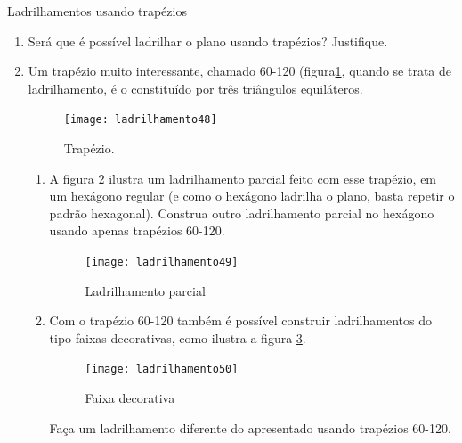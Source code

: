 \begin{task}{Ladrilhamentos usando trapézios}
\begin{enumerate}
\item Será que é possível ladrilhar o plano usando trapézios? Justifique.

\item Um trapézio muito interessante, chamado 60-120 (figura\ref{trap1}, quando se trata de ladrilhamento, é o constituído por três triângulos equiláteros.

\begin{figure}[H]
\centering
\texttt{[image: ladrilhamento48]}
\label{trap1}
\caption{Trapézio.}
\end{figure}

\begin{enumerate}
	\item A figura \ref{trap2} ilustra um ladrilhamento parcial feito com esse trapézio, em um hexágono regular (e como o hexágono ladrilha o plano, basta repetir o padrão hexagonal). Construa outro ladrilhamento parcial no hexágono usando apenas trapézios 60-120.

	\begin{figure}[H]
	\centering
	\texttt{[image: ladrilhamento49]}
	\caption{Ladrilhamento parcial}
	\label{trap2}
	\end{figure}

	\item Com o trapézio 60-120 também é possível construir ladrilhamentos do tipo faixas decorativas, como ilustra a figura  \ref{trap3}. 

	\begin{figure}[H]
	\centering
	\texttt{[image: ladrilhamento50]}
	\caption{Faixa decorativa}
     \label{trap3}
	\end{figure}
	
Faça um ladrilhamento diferente do apresentado usando trapézios 60-120.

\end{enumerate}
\end{enumerate}
\end{task}

